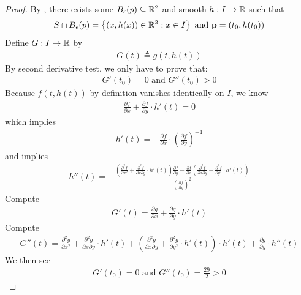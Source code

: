 \documentclass{report}
\begin{document}
\begin{proof}
By , there exists some $B_\epsilon  (p)\subseteq \mathbb{R}^2$ and smooth $h:I \rightarrow \mathbb{R}$ such that 
\begin{align*}
S \cap  B_\epsilon (p)= \left\{ (x,h(x))\in\mathbb{R}^2: x\in I \right\}\text{ and }\textbf{p}=(t_0,h(t_0))
\end{align*}
Define $G:I \rightarrow \mathbb{R}$  by 
\begin{align*}
  G(t)\triangleq g(t,h(t))
\end{align*}
By second derivative test, we only have to prove that: 
\begin{align*}
G'(t_0)=0 \text{ and }G''(t_0)>0 
\end{align*}
Because $f(t,h(t))$ by definition vanishes identically on $I$, we know  
\begin{align*}
\frac{\partial f}{\partial x} + \frac{\partial f}{\partial y} \cdot h'(t) = 0
\end{align*}
which implies 
\begin{align*}
h'(t)= - \frac{\partial f}{\partial x} \cdot \left(\frac{\partial f}{\partial y} \right)^{-1} 
\end{align*}
and implies 
\begin{align*}
h''(t) = - \frac{ \left( \frac{\partial^2 f}{\partial x^2 } + \frac{\partial ^2f }{\partial x\partial y} \cdot h'(t) \right) \frac{\partial f}{\partial y}- \frac{\partial f}{\partial x}\left( \frac{\partial ^2f}{\partial x\partial y} + \frac{\partial ^2 f}{\partial y^2} \cdot h'(t)  \right)}{\left( \frac{\partial f}{\partial y} \right)^2}
\end{align*}
Compute 
\begin{align*}
G'(t) = \frac{\partial g}{\partial x}+ \frac{\partial g}{\partial  y} \cdot h'(t)
\end{align*}
Compute 
\begin{align*}
G''(t)=\frac{\partial^2 g}{\partial x^2}+ \frac{\partial^2 g}{\partial x \partial y} \cdot h'(t) +  \left( \frac{\partial ^2 g}{\partial x\partial y}+ \frac{\partial^2 g}{\partial y^2} \cdot h'(t) \right) \cdot h'(t) + \frac{\partial g}{\partial y} \cdot h''(t) 
\end{align*}
We then see 
\begin{align*}
G'(t_0)=0 \text{ and }G''(t_0)= \frac{29}{2}>0 
\end{align*}
\end{proof}
\end{document}
